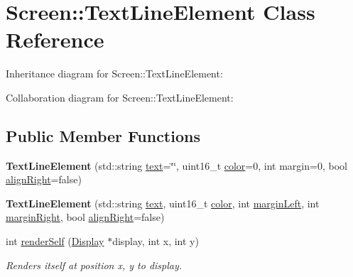 \hypertarget{classScreen_1_1TextLineElement}{}\section{Screen\+:\+:Text\+Line\+Element Class Reference}
\label{classScreen_1_1TextLineElement}


Inheritance diagram for Screen\+:\+:Text\+Line\+Element\+:


Collaboration diagram for Screen\+:\+:Text\+Line\+Element\+:
\subsection*{Public Member Functions}
\begin{DoxyCompactItemize}
\item 
\mbox{\label{classScreen_1_1TextLineElement_ae0de60080a1c3f6c1be23448927e0717}} 
{\bfseries Text\+Line\+Element} (std\+::string \mbox{\hyperlink{classScreen_1_1TextLineElement_ad2495931e2dd28b0d7cb5d8c761dedad}{text}}=\char`\"{}\char`\"{}, uint16\+\_\+t \mbox{\hyperlink{classScreen_1_1TextLineElement_ac4fa4d52ead8e4b38ba18c673875fae2}{color}}=0, int margin=0, bool \mbox{\hyperlink{classScreen_1_1LineElement_a0c5f4e33c2df1dce8e4e45b90dac1423}{align\+Right}}=false)
\item 
\mbox{\label{classScreen_1_1TextLineElement_ae6f666d60594d487b9c43310c470ec59}} 
{\bfseries Text\+Line\+Element} (std\+::string \mbox{\hyperlink{classScreen_1_1TextLineElement_ad2495931e2dd28b0d7cb5d8c761dedad}{text}}, uint16\+\_\+t \mbox{\hyperlink{classScreen_1_1TextLineElement_ac4fa4d52ead8e4b38ba18c673875fae2}{color}}, int \mbox{\hyperlink{classScreen_1_1LineElement_a9ed23f9510a11334af9be6f53965f7a6}{margin\+Left}}, int \mbox{\hyperlink{classScreen_1_1LineElement_a3a2077f01072be8e8fd0f4539b85beb0}{margin\+Right}}, bool \mbox{\hyperlink{classScreen_1_1LineElement_a0c5f4e33c2df1dce8e4e45b90dac1423}{align\+Right}}=false)
\item 
int \mbox{\hyperlink{classScreen_1_1TextLineElement_abcd2e0700f84bb19d7a285345cd37871}{render\+Self}} (\mbox{\hyperlink{classDisplay}{Display}} $\ast$display, int x, int y)
\begin{DoxyCompactList}\small\item\em Renders itself at position x, y to display. \end{DoxyCompactList}\end{DoxyCompactItemize}
